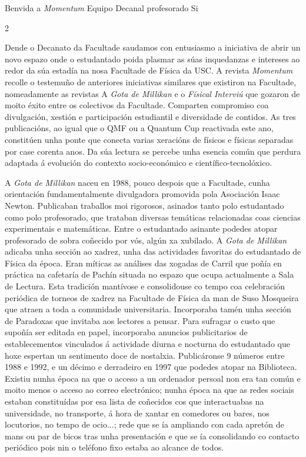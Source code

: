 \titular%
{Benvida a \textit{Momentum}}
{Equipo Decanal}
{profesorado}
{}
{Si}

\vspace{-1.1cm}

\begin{multicols}{2}

Dende o Decanato da Facultade saudamos con entusiasmo a iniciativa de abrir un
novo espazo onde o estudantado poida plasmar as súas inquedanzas e intereses ao
redor da súa estadía na nosa Facultade de Física da USC. A revista \textit{Momentum}
recolle o testemuño de anteriores iniciativas similares que existiron na
Facultade, nomeadamente as revistas A \textit{Gota de Millikan} e o \textit{Físical Interviú} que
gozaron de moito éxito entre os colectivos da Facultade. Comparten compromiso
coa divulgación, xestión e participación estudiantil e diversidade de contidos.
As tres publicacións, ao igual que o QMF ou a Quantum Cup reactivada este ano,
constitúen unha ponte que conecta varias xeracións de físicos e físicas
separadas por case corenta anos. Da súa lectura se percebe unha esencia común
que perdura adaptada á evolución do contexto socio-económico e
científico-tecnolóxico.

A \textit{Gota de Millikan} naceu en 1988, pouco despois que a Facultade, cunha
orientación fundamentalmente divulgadora promovida pola Asociación Isaac
Newton. Publicaban traballos moi rigorosos, asinados tanto polo estudantado
como polo profesorado, que trataban diversas temáticas relacionadas coas
ciencias experimentais e matemáticas. Entre o estudantado asinante podedes
atopar profesorado de sobra coñecido por vós, algún xa xubilado. A \textit{Gota de Millikan}
 adicaba unha sección ao xadrez, unha das actividades favoritas do
estudantado de Física da época. Eran míticas as análises das xogadas de Carril
que poñía en práctica na cafetaría de Pachín situada no espazo que ocupa
actualmente a Sala de Lectura. Esta tradición mantívose e consolidouse co tempo
coa celebración periódica de torneos de xadrez na Facultade de Física da man de
Suso Mosqueira que atraen a toda a comunidade universitaria. Incorporaba tamén
unha sección de Paradoxas que invitaba aos lectores a pensar. Para sufragar o
custo que supoñía ser editada en papel, incorporaba anuncios publicitarios de
establecementos vinculados á actividade diurna e nocturna do estudantado que
hoxe espertan un sentimento doce de nostalxia. Publicáronse 9 números entre
1988 e 1992, e un décimo e derradeiro en 1997 que podedes atopar na Biblioteca.
Existiu nunha época na que o acceso a un ordenador persoal non era tan común e
moito menos o acceso ao correo electrónico; nunha época na que as redes sociais
estaban constituídas por esa lista de coñecidos cos que interactuabas na
universidade, no transporte, á hora de xantar en comedores ou bares, nos
locutorios, no tempo de ocio...; rede que se ía ampliando con cada apretón de
mans ou par de bicos tras unha presentación e que se ía consolidando co contacto
periódico pois nin o teléfono fixo estaba ao alcance de todos.


\end{multicols}
